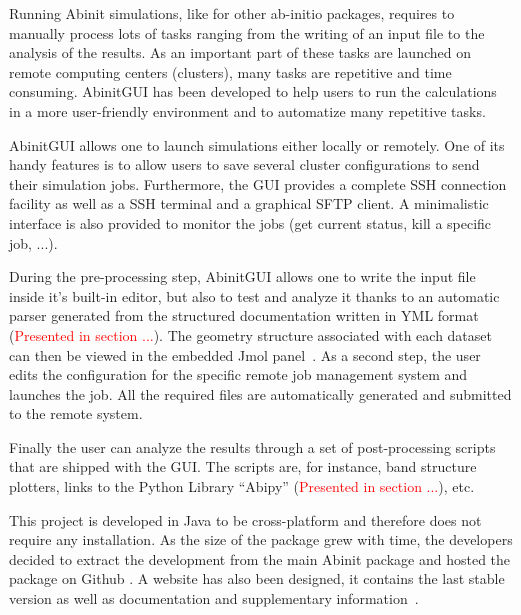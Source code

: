 Running Abinit simulations, like for other ab-initio packages, requires to 
manually process lots of tasks ranging from the writing of an input file to 
the analysis of the results. As an 
important part of these tasks are launched on remote computing centers 
(clusters), many tasks are repetitive and time consuming.
AbinitGUI has been developed to help users to run the 
calculations in a more 
user-friendly environment and to automatize many repetitive tasks.

AbinitGUI allows one to launch simulations either locally 
or remotely. One of its handy features is to allow users to save several 
cluster configurations to send their simulation jobs. Furthermore, the GUI 
provides a complete SSH connection facility as well as a SSH terminal and a 
graphical SFTP client. A minimalistic interface is also provided to monitor the 
jobs (get current status, kill a specific job, ...).


During the pre-processing step, AbinitGUI allows one to write the input file 
inside 
it's built-in editor, but also to test and analyze it thanks to an automatic 
parser generated from the structured 
documentation written in YML format (\textcolor{red}{Presented in section 
...}). 
The geometry structure associated with each dataset can then be viewed in the 
embedded Jmol 
panel~\cite{Jmol}.
As a second step, the user edits the configuration for the specific remote job 
management system and launches the job. All the required files are
automatically 
generated and submitted to the remote system.

Finally the user can analyze the results through a 
set of post-processing scripts that are shipped with the GUI. The scripts are, 
for instance, band structure plotters, links to the Python Library ``Abipy'' 
(\textcolor{red}{Presented in section ...}), etc.

This project is developed in Java to be cross-platform and therefore does not 
require any installation. As the size of the package grew with time, the 
developers decided to extract the development from the main Abinit package and 
hosted the package on Github 
\cite{github-abinitgui}. A website 
has also been designed, it contains the last 
stable version as well as documentation and supplementary 
information~\cite{site-abinitgui}.